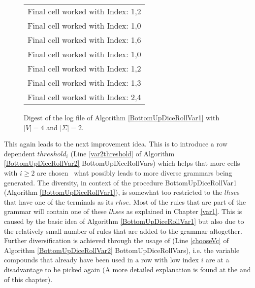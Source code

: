 \begin{figure}[h]
	\centering
		\begin{tabular}{l}
			Final cell worked with Index: 1,2\\
			Final cell worked with Index: 1,0\\
			Final cell worked with Index: 1,6 \\
			Final cell worked with Index: 1,0\\
			Final cell worked with Index: 1,2\\
			Final cell worked with Index: 1,3\\
			Final cell worked with Index: 2,4\\
	\end{tabular}
	\caption{Digest of the log file of Algorithm \ref{BottomUpDiceRollVar1} with $|V|=4$ and $|\Sigma|=2$.}
	\label{logsVar1}
\end{figure}
\noindent This again leads to the next improvement idea. This is to introduce a row dependent $threshold_i$ (Line \ref{var2threshold} of Algorithm \ref{BottomUpDiceRollVar2} BottomUpDiceRollVars) which helps that more cells with $i\geq2$ are chosen \textendash~what possibly leads to more diverse grammars being generated. The diversity, in context of the procedure BottomUpDiceRollVar1 (Algorithm \ref{BottomUpDiceRollVar1}), is somewhat too restricted to the $lhse$s that have one of the terminals as its $rhse$. Most of the rules that are part of the grammar will contain one of these $lhse$s as explained in Chapter \ref{var1}. This is caused by the basic idea of Algorithm \ref{BottomUpDiceRollVar1} but also due to the relatively small number of rules that are added to the grammar altogether. \\
Further diversification is achieved through the usage of  (Line \ref{chooseVc} of Algorithm \ref{BottomUpDiceRollVar2} BottomUpDiceRollVars), i.e. the variable compounds that already have been used in a row with low index $i$ are at a disadvantage to be picked again (A more detailed explanation is found at the and of this chapter).\\

